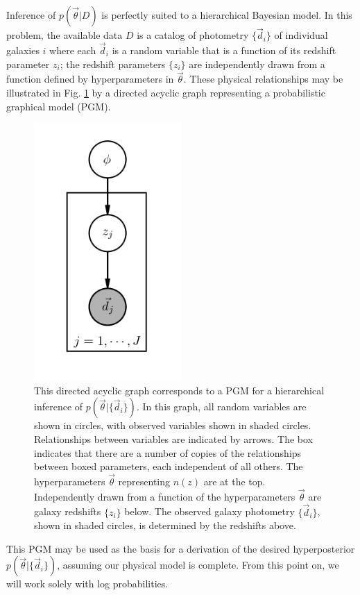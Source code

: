\documentclass[preprint]{aastex}
\begin{document}
Inference of $p(\vec{\theta}|D)$ is perfectly suited to a hierarchical Bayesian model.  In this problem, the available data $D$ is a catalog of photometry $\{\vec{d}_{i}\}$ of individual galaxies $i$ where each $\vec{d}_{i}$ is a random variable that is a function of its redshift parameter $z_{i}$; the redshift parameters $\{z_{i}\}$ are independently drawn from a function defined by hyperparameters in $\vec{\theta}$.  These physical relationships may be illustrated in Fig. \ref{fig:pgm} by a directed acyclic graph representing a probabilistic graphical model (PGM).
\begin{figure}
\begin{center}
\includegraphics[width=0.5\textwidth]{pgm.png}
\caption{This directed acyclic graph corresponds to a PGM for a hierarchical inference of $p(\vec{\theta}|\{\vec{d}_{i}\})$.  In this graph, all random variables are shown in circles, with observed variables shown in shaded circles.  Relationships between variables are indicated by arrows.  The box indicates that there are a number of copies of the relationships between boxed parameters, each independent of all others.  The hyperparameters $\vec{\theta}$ representing $n(z)$ are at the top.  Independently drawn from a function of the hyperparameters $\vec{\theta}$ are galaxy redshifts $\{z_{i}\}$ below.  The observed galaxy photometry $\{\vec{d}_{i}\}$, shown in shaded circles, is determined by the redshifts above.}
\label{fig:pgm}
\end{center}
\end{figure}
This PGM may be used as the basis for a derivation of the desired hyperposterior $p(\vec{\theta}|\{\vec{d}_{i}\})$, assuming our physical model is complete.  From this point on, we will work solely with log probabilities.
\end{document}
